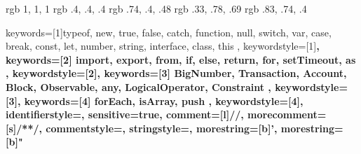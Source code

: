 \usepackage[italian]{babel}
\usepackage[usenames]{color}

\usepackage{hyperref}
\hypersetup{
    colorlinks=true,
    citecolor=black,
    filecolor=black,
    linkcolor=blue,
    urlcolor=blue
}

\usepackage{listings}
\usepackage{makeidx}
\usepackage[a4paper,top=2cm,bottom=2.2cm,left=2.5cm,right=2.5cm]{geometry}
\usepackage{float}
\usepackage{color}
	\definecolor{lightgray} {rgb} { 1, 1, 1 }
	\definecolor{darkgray} {rgb} { .4, .4, .4 }
  \definecolor{purple} {rgb} { .74, .4, .48 }
  \definecolor{green} {rgb} { .33, .78, .69 }
  \definecolor{yellow} {rgb} { .83, .74, .4 }

 {
  keywords=[1]{typeof, new, true, false, catch, function, null, switch, var, case, break, const, let, number, string, interface, class, this },
  keywordstyle=[1]\color{blue}\bfseries,
  keywords=[2]{ import, export, from, if, else, return, for, setTimeout, as },
  keywordstyle=[2]\color{purple}\bfseries,
  keywords=[3]{ BigNumber, Transaction, Account, Block, Observable, any, LogicalOperator, Constraint },
  keywordstyle=[3]\color{green}\bfseries,
  keywords=[4]{ forEach, isArray, push },
  keywordstyle=[4]\color{yellow}\bfseries,
  identifierstyle=\color{black},
  sensitive=true,
  comment=[l]{//},
  morecomment=[s]{/*}{*/},
  commentstyle=\color{purple}\ttfamily,
  stringstyle=\color{red}\ttfamily,
  morestring=[b]',
  morestring=[b]"
}

\usepackage{graphicx}
\graphicspath{ {Images/} }
